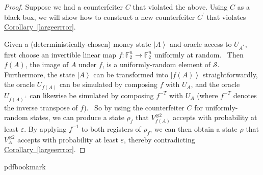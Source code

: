 \documentclass[10pt]{article}
\theoremstyle{definition}
\numberwithin{equation}{section}
\newcommand{\expref}[2]{\texorpdfstring{\hyperref[#2]{#1~\ref{#2}}}{#1~\ref{#2}}}
\begin{document}
\begin{proof}
Suppose we had a counterfeiter $C$ that violated the above. Using $C$ as a
black box, we will show how to construct a new counterfeiter $C^{\prime}%
$ that violates \expref{Corollary}{largeerrror}.

Given a (deterministically-chosen) money state $\left\vert A\right\rangle $
and oracle access to $U_{A^{\ast}}$, first choose an invertible linear map
$f:\mathbb{F}_{2}^{n}\rightarrow\mathbb{F}_{2}^{n}$ uniformly at random.
\ Then $f\left(  A\right)  $, the image of $A$ under $f$, is a
uniformly-random element of $\mathcal{S}$. Furthermore, the state
$\left\vert A\right\rangle $ can be transformed into $\left\vert f\left(
A\right)  \right\rangle $ straightforwardly, the oracle $U_{f\left(
A\right)  }$ can be simulated by composing $f$ with $U_{A}$, and the oracle
$U_{f\left(  A\right)  ^{\bot}}$ can likewise be simulated by composing
$f^{-T}$ with $U_{A}$ (where $f^{-T}$ denotes the inverse transpose of $f$).
\ So by using the counterfeiter $C$ for uniformly-random states, we can
produce a state $\rho_{f}$ that $V_{f\left(  A\right)  }^{\otimes2}$ accepts
with probability at least $\varepsilon$. By applying $f^{-1}$ to both
registers of $\rho_{f}$, we can then obtain a state $\rho$ that
$V_{A}^{\otimes2}$ accepts with probability at least $\varepsilon$, thereby
contradicting \expref{Corollary}{largeerrror}.
\end{proof}
\clearpage
\begingroup\raggedright
%
%
%
%
%
\providecommand{\bibhead}[1]{}
%
\expandafter\ifx\csname pdfbookmark\endcsname\relax%
  \providecommand{\tocrefpdfbookmark}{}
\else\providecommand{\tocrefpdfbookmark}{%
   \hypertarget{tocreferences}{}%
   \pdfbookmark[1]{References}{tocreferences}}%
\fi
\end{document}
